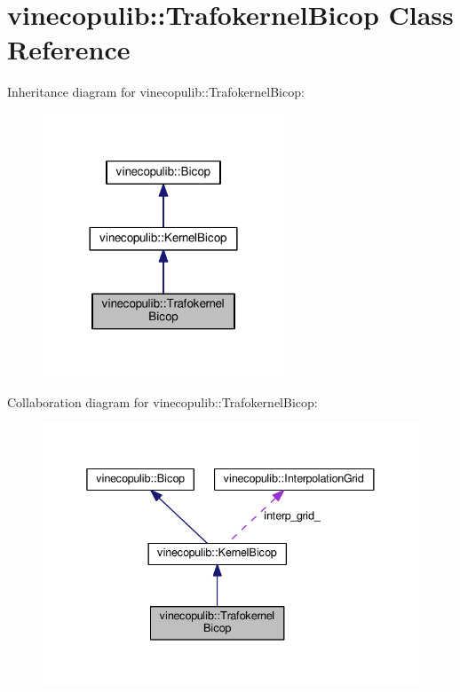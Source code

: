 \hypertarget{classvinecopulib_1_1_trafokernel_bicop}{}\section{vinecopulib\+:\+:Trafokernel\+Bicop Class Reference}
\label{classvinecopulib_1_1_trafokernel_bicop}


Inheritance diagram for vinecopulib\+:\+:Trafokernel\+Bicop\+:\nopagebreak
\begin{figure}[H]
\begin{center}
\leavevmode
\includegraphics[width=204pt]{classvinecopulib_1_1_trafokernel_bicop__inherit__graph}
\end{center}
\end{figure}


Collaboration diagram for vinecopulib\+:\+:Trafokernel\+Bicop\+:\nopagebreak
\begin{figure}[H]
\begin{center}
\leavevmode
\includegraphics[width=338pt]{classvinecopulib_1_1_trafokernel_bicop__coll__graph}
\end{center}
\end{figure}
